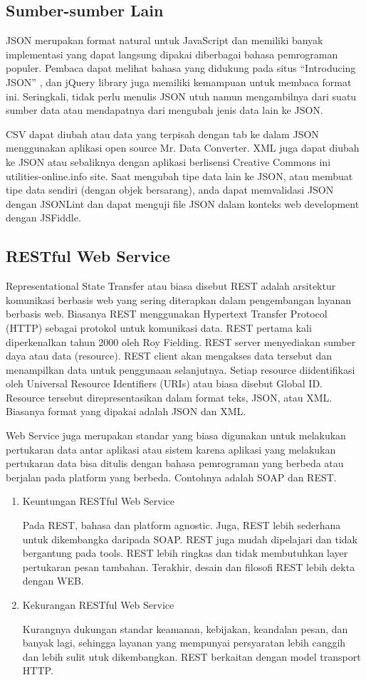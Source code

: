 \subsection{Sumber-sumber Lain}
JSON merupakan format natural untuk JavaScript dan memiliki banyak implementasi yang dapat langsung dipakai diberbagai bahasa pemrograman populer. Pembaca dapat melihat bahasa yang didukung pada situs “Introducing JSON” , dan jQuery library juga memiliki kemampuan untuk membaca format ini. Seringkali, tidak perlu menulis JSON utuh namun mengambilnya dari suatu sumber data atau mendapatnya dari mengubah jenis data lain ke JSON. 

CSV dapat diubah atau data yang terpisah dengan tab ke dalam JSON menggunakan aplikasi open source Mr. Data Converter. XML juga dapat diubah ke JSON atau sebaliknya dengan aplikasi berlisensi Creative Commons ini utilities-online.info site. Saat mengubah tipe data lain ke JSON, atau membuat tipe data sendiri (dengan objek bersarang), anda dapat memvalidasi JSON dengan JSONLint dan dapat menguji file JSON dalam konteks web development dengan JSFiddle.

\subsection{RESTful Web Service}
Representational State Transfer atau biasa disebut REST adalah arsitektur komunikasi berbasis web yang sering diterapkan dalam pengembangan layanan berbasis web. Biasanya REST menggunakan Hypertext Transfer Protocol (HTTP) sebagai protokol untuk komunikasi data. REST pertama kali diperkenalkan tahun 2000 oleh Roy Fielding. REST server menyediakan sumber daya atau data (resource). REST client akan mengakses data tersebut dan menampilkan data untuk penggunaan selanjutnya. Setiap resource diidentifikasi oleh Universal Resource Identifiers (URIs) atau biasa disebut Global ID. Resource tersebut direpresentasikan dalam format teks, JSON, atau XML. Biasanya format yang dipakai adalah JSON dan XML.

Web Service juga merupakan standar yang biasa digunakan untuk melakukan pertukaran data antar aplikasi atau sistem karena aplikasi yang melakukan pertukaran data bisa ditulis dengan bahasa pemrograman yang berbeda atau berjalan pada platform yang berbeda. Contohnya adalah SOAP dan REST.
\begin{enumerate}
\item Keuntungan RESTful Web Service

Pada REST, bahasa dan platform agnostic. Juga, REST lebih sederhana untuk dikembangka daripada SOAP. REST juga mudah dipelajari dan tidak bergantung pada tools. REST lebih ringkas dan tidak  membutuhkan layer pertukaran pesan tambahan. Terakhir, desain dan filosofi REST lebih dekta dengan WEB. 

\item Kekurangan RESTful Web Service

Kurangnya dukungan standar keamanan, kebijakan, keandalan pesan, dan banyak lagi, sehingga layanan yang mempunyai persyaratan lebih canggih dan lebih sulit utuk dikembangkan. REST berkaitan dengan model transport HTTP.
\end{enumerate}

